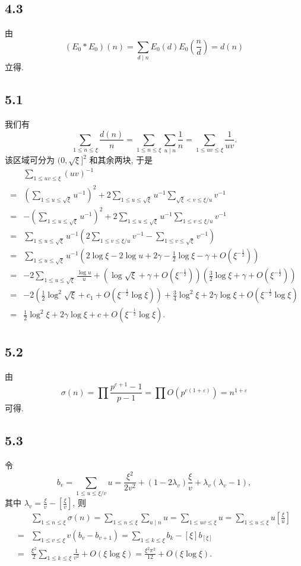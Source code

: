 \documentclass[12pt,a4paper,reqno]{amsart}
\theoremstyle{remark}
\renewcommand{\le}{\leqslant}
\begin{document}
\subsection*{4.3}
由 \[(E_0*E_0)(n)=\sum_{d\mid n}E_0(d)E_0(\frac{n}{d})=d(n)\] 立得.

\subsection*{5.1}
我们有
  \[\sum_{1\le n\le \xi} \frac{d(n)}{n}=\sum_{1\le n\le \xi}\sum_{u\mid n}\frac{1}{n}=\sum_{1\le uv\le \xi}\frac{1}{uv}.\]
该区域可分为 $(0,\sqrt{\xi}]^2$ 和其余两块, 于是
  \[\begin{split}
    &\sum_{1\le uv\le \xi}(uv)^{-1}\\
   =&(\sum_{1\le u\le\sqrt{\xi}}u^{-1})^2+2\sum_{1\le u\le\sqrt{\xi}}u^{-1} \sum_{\sqrt{\xi}< v\le\xi/u}v^{-1}\\
   =&-(\sum_{1\le u\le\sqrt{\xi}}u^{-1})^2+2\sum_{1\le u\le\sqrt{\xi}}u^{-1} \sum_{1\le v\le\xi/u}v^{-1}\\
   =&\sum_{1\le u\le\sqrt{\xi}}u^{-1}(2 \sum_{1\le v\le\xi/u}v^{-1}-\sum_{1\le v\le\sqrt{\xi}}v^{-1})\\
   =&\sum_{1\le u\le\sqrt{\xi}}u^{-1}(2\log \xi-2\log u+2\gamma-\frac{1}{2}\log \xi-\gamma+O(\xi^{-\frac{1}{2}}))\\
   =&-2\sum_{1\le u\le\sqrt{\xi}}\frac{\log u}{u}+(\log \sqrt{\xi}+\gamma+O(\xi^{-\frac{1}{2}}))(\frac{3}{2}\log \xi+\gamma+O(\xi^{-\frac{1}{2}}))\\
   =&-2(\frac{1}{2}\log^2\sqrt{\xi}+c_1+O(\xi^{-\frac{1}{2}}\log \xi))+\frac{3}{4}\log^2\xi+2\gamma\log \xi+O(\xi^{-\frac{1}{2}}\log\xi)\\
   =&\frac{1}{2}\log^2\xi+2\gamma\log \xi+c+O(\xi^{-\frac{1}{2}}\log\xi).
  \end{split}\]

\subsection*{5.2}
由
  \[\sigma(n)=\prod \frac{p^{e+1}-1}{p-1}=\prod O(p^{e(1+\varepsilon)})=n^{1+\varepsilon}\]
可得.

\subsection*{5.3}
令 \[b_v=\sum_{1\le u\le \xi/v} u=\frac{\xi^2}{2v^2}+(1-2\lambda_v)\frac{\xi}{v}+\lambda_v(\lambda_v-1),\]
其中 $\lambda_v=\frac{\xi}{v}-[\frac{\xi}{v}]$, 则
\[\begin{split}
   &\sum_{1\le n\le \xi}\sigma(n) =\sum_{1\le n\le \xi}\sum_{u\mid n}u=\sum_{1\le uv\le \xi} u=\sum_{1\le u\le \xi} u[\frac{\xi}{u}]\\
  =&\sum_{1\le v\le \xi}v(b_v-b_{v+1})=\sum_{1\le k\le \xi}b_k-[\xi]b_{[\xi]}\\
  =&\frac{\xi^2}{2}\sum_{1\le k\le \xi}\frac{1}{v^2}+O(\xi\log\xi)=\frac{\xi^2\pi^2}{12}+O(\xi\log\xi).
\end{split}\]
\end{document}

